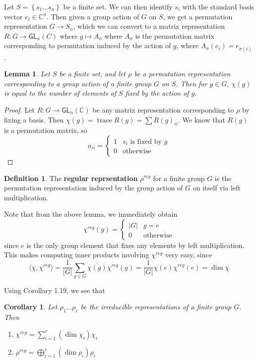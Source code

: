 \documentclass[psamsfonts]{amsart}
\newtheorem{cor}[thm]{Corollary}
\newtheorem{lem}[thm]{Lemma}
\theoremstyle{definition}
\newtheorem{defn}[thm]{Definition}
\theoremstyle{remark}
\newcommand{\C}{\mathbb{C}}
\newcommand{\GL}{\mathsf{GL}}
\newcommand{\set}[1]{\left\lbrace#1 \right\rbrace}
\newcommand{\abs}[1]{\left\lvert#1\right\rvert}
\DeclareMathOperator{\trace}{trace}
\begin{document}
Let $S = \set{s_1 \ldots s_n}$ be a finite set. We can then identify $s_i$ with the standard basis vector $e_i \in \C^n$. Then given a group action of $G$ on $S$, we get a permutation representation $G \to S_n$, which we can convert to a matrix representation $R: G \to \GL_n(C)$ where $g \mapsto A_\sigma$ where $A_\sigma$ is the permutation matrix corresponding to permutation induced by the action of $g$, where $A_\sigma(e_i) = e_{\sigma(i)}$.

\begin{lem}
Let $S$ be a finite set, and let $\rho$ be a permutation representation corresponding to a group action of a finite group $G$ on $S$. Then for $g \in G$, $\chi(g)$ is equal to the number of elements of $S$ fixed by the action of $g$.
\end{lem}

\begin{proof}
Let $R: G \to \GL_n(\C)$ be any matrix representation corresponding to $\rho$ by fixing a basis. Then $\chi(g) = \trace R(g) = \sum R(g)_{ii}$. We know that $R(g)$ is a permutation matrix, so 
$$a_{ii} = \begin{cases}
1 & s_i \text{ is fixed by } g \\
0 & \text{otherwise}
\end{cases} $$
\end{proof}

\begin{defn}
The \textbf{regular reprsentation} $\rho^{reg}$ for a finite group $G$ is the permutation representation induced by the group action of $G$ on itself via left multiplication.
\end{defn}

Note that from the above lemma, we immediately obtain
$$\chi^{reg}(g) = \begin{cases}
\abs{G} & g = e \\
0 & \text{otherwise}
\end{cases} $$
since $e$ is the only group element that fixes any elements by left multiplication. This makes computing inner products involving $\chi^{reg}$ very easy, since
$$\langle \chi, \chi^{reg} \rangle = \frac{1}{\abs{G}}\sum_{g \in G} \overline{\chi(g)}\chi^{reg}(g) = \frac{1}{\abs{G}}\chi(e)\chi^{reg}(e) = \dim \chi $$

Using Corollary 1.19, we see that
\begin{cor}
Let $\rho_1 \ldots \rho_r$ be the irreducible representations of a finite group $G$. Then
\begin{enumerate}
\item $\chi^{reg} = \sum_{i = 1}^r (\dim \chi_i)\chi_i$
\item $\rho^{reg} = \bigoplus_{i = 1}^r (\dim \rho_i) \rho_i$
\end{enumerate}
\end{cor}
\end{document}
